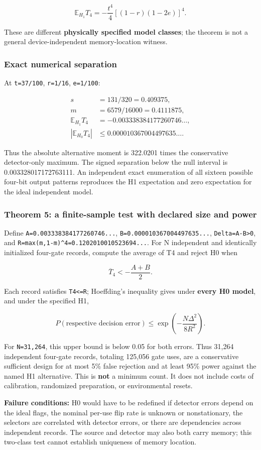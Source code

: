 \documentclass[
  10pt,
  a4paper,
]{article}
\begin{document}
\[
\boxed{\mathbb E_{H_1}T_4=-\frac{t^4}{4}\left[(1-r)(1-2e)\right]^4.}
\]

These are different \textbf{physically specified model classes}; the theorem is not a general device-independent memory-location witness.

\subsubsection{Exact numerical separation}\label{exact-numerical-separation}

At \texttt{t=37/100}, \texttt{r=1/16}, \texttt{e=1/100}:

\[
\begin{aligned}
s&=131/320=0.409375,\\
m&=6579/16000=0.4111875,\\
\mathbb E_{H_1}T_4&=-0.003338384177260746\ldots,\\
|\mathbb E_{H_0}T_4|&\le 0.000010367004497635\ldots.
\end{aligned}
\]

Thus the absolute alternative moment is 322.0201 times the conservative detector-only maximum. The signed separation below the null interval is 0.003328017172763111. An independent exact enumeration of all sixteen possible four-bit output patterns reproduces the H1 expectation and zero expectation for the ideal independent model.

\subsubsection{Theorem 5: a finite-sample test with declared size and power}\label{theorem-5-a-finite-sample-test-with-declared-size-and-power}

Define \texttt{A=0.003338384177260746...}, \texttt{B=0.000010367004497635...}, \texttt{Delta=A-B\textgreater{}0}, and \texttt{R=max(m,1-m)\^{}4=0.1202010010523694...}. For N independent and identically initialized four-gate records, compute the average of T4 and reject H0 when

\[
\overline T_4<-\frac{A+B}{2}.
\]

Each record satisfies \texttt{\textbar{}T4\textbar{}\textless{}=R}; Hoeffding's inequality gives under \textbf{every H0 model}, and under the specified H1,

\[
P(\text{respective decision error})\le\exp\left(-\frac{N\Delta^2}{8R^2}\right).
\]

For \texttt{N=31,264}, this upper bound is below 0.05 for both errors. Thus 31,264 independent four-gate records, totaling 125,056 gate uses, are a conservative sufficient design for at most 5\% false rejection and at least 95\% power against the named H1 alternative. This is \textbf{not} a minimum count. It does not include costs of calibration, randomized preparation, or environmental resets.

\textbf{Failure conditions:} H0 would have to be redefined if detector errors depend on the ideal flags, the nominal per-use flip rate is unknown or nonstationary, the selectors are correlated with detector errors, or there are dependencies across independent records. The source and detector may also both carry memory; this two-class test cannot establish uniqueness of memory location.
\end{document}
